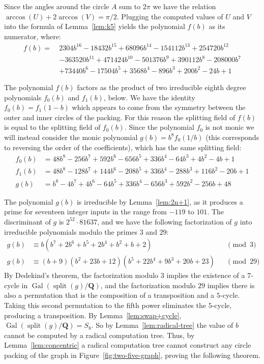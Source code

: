 \documentclass[oribibl,10pt]{llncs}
\newcommand{\rationals}{\mathbf{Q}}
\DeclareMathOperator{\Gal}{Gal}
\DeclareMathOperator{\splitting}{split}
\begin{document}
\begin{appendix}
Since the angles around the circle $A$ sum to $2\pi$ we have the relation $\arccos(U) + 2\arccos(V) = \pi/2$. Plugging the computed values of $U$ and $V$ into the formula of Lemma~\ref{lem:k5} yields the polynomial $f(b)$ as its numerator, where:
\begin{align*}
f(b) =\ &2304b^{16} - 18432b^{15} + 68096b^{14} - 154112b^{13} + 254720b^{12}\\ &- 363520b^{11} + 471424b^{10} - 501376b^9 + 390112b^8 - 208000b^7\\ &+ 73440b^6 - 17504b^5 + 3568b^4 - 896b^3 + 200b^2 - 24b + 1
\end{align*}

The polynomial $f(b)$ factors as the product of two irreducible eighth degree polynomials $f_0(b)$ and $f_1(b)$, below. We have the identity $f_0(b) = f_1(1-b)$ which appears to come from the symmetry between the outer and inner circles of the packing. For this reason the splitting field of $f(b)$ is equal to the splitting field of $f_0(b)$. Since the polynomial $f_0$ is not monic we will instead consider the monic polynomial $g(b) = b^8f_0(1/b)$ (this corresponds to reversing the order of the coefficients), which has the same splitting field:
\begin{align*}
f_0(b) &=48b^8 - 256b^7 + 592b^6 - 656b^5 + 336b^4 - 64b^3 + 4b^2 - 4b + 1\\
f_1(b) &= 48b^8 - 128b^7 + 144b^6 - 208b^5 + 336b^4 - 288b^3 + 116b^2 - 20b + 1\\
g(b) &= b^8 - 4b^7 + 4b^6 - 64b^5+336b^4-656b^3+592b^2-256b +48
\end{align*}

The polynomial $g(b)$ is irreducible by Lemma~\ref{lem:2n+1}, as it produces a prime for seventeen integer inputs in the range from $-119$ to $101$.
The discriminant of $g$ is $2^{52} \cdot 81637$, and we have the following factorization of $g$ into irreducible polynomials modulo the primes $3$ and $29$:
\begin{align*}
g(b) &\equiv b  (b^7 + 2b^6 + b^5 + 2b^4 + b^2 + b + 2) &&\pmod{3}\\
g(b) &\equiv (b + 9)  (b^2 + 23b + 12)  (b^5 + 22b^4 + 9b^3 + 20b + 23) &&\pmod{29}
\end{align*}
By Dedekind's theorem, the factorization modulo $3$ implies the existence of a $7$-cycle in $\Gal(\splitting(g)/\rationals)$, and the factorization modulo $29$ implies there is also a permutation that is the composition of a transposition and a $5$-cycle. Taking this second permutation to the fifth power eliminates the $5$-cycle, producing a transposition. By Lemma~\ref{lem:swap+cycle}, $\Gal(\splitting(g)/\rationals) = S_8$. So by Lemma~\ref{lem:radical-tree} the value of $b$ cannot be computed by a radical computation tree. Thus, by Lemma~\ref{lem:concentric}  a radical computation tree cannot construct any circle packing of the graph in Figure~\ref{fig:two-five-graph}, proving the following theorem.


\end{appendix}
\end{document}
